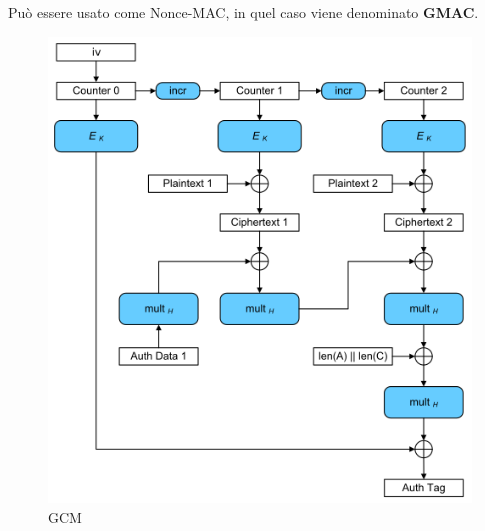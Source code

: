  

\textsf{\small Può essere usato come Nonce-MAC, in quel caso viene denominato \textbf{GMAC}.}

\begin{figure}[H]
	\centering
	\includegraphics[width=.9\textwidth, height=.9\textheight, keepaspectratio]{./images/aes_modes/GCM-Galois_Counter_Mode_with_IV} 
	\caption{GCM}
	\label{fig:gcm}
\end{figure}

